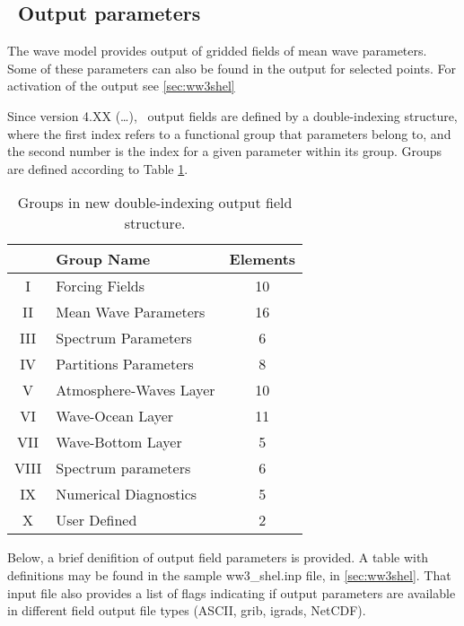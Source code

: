 \vssub
\subsection{~Output parameters} \label{sub:outpars}
\vssub

The wave model provides output of gridded fields of mean wave
parameters. Some of these parameters can also be found in the output for
selected points. For activation of the output see \para\ref{sec:ww3shel}

Since version 4.XX (\ldots), \ws\ output fields are defined by a
double-indexing structure, where the first index refers to a functional group
that parameters belong to, and the second number is the index for a given
parameter within its group. Groups are defined according to Table
\ref{tab:noge}.

\begin{table} \begin{center}
 \begin{tabular}{|c|l|c|} \hline \hline
     & Group Name & Elements \\ \hline
 I   & Forcing Fields & 10 \\
 II  & Mean Wave Parameters & 16 \\ 
 III & Spectrum Parameters & 6 \\
 IV  & Partitions Parameters & 8 \\
 V   & Atmosphere-Waves Layer & 10 \\
 VI  & Wave-Ocean Layer & 11 \\
 VII & Wave-Bottom Layer & 5 \\
 VIII& Spectrum parameters & 6 \\
 IX  & Numerical Diagnostics & 5 \\
 X   & User Defined & 2 \\ \hline
\end{tabular} \end{center}
\caption{Groups in new double-indexing output field structure.}
\label{tab:noge} \botline \end{table}

Below, a brief denifition of output field parameters is provided. A table
with definitions may be found in the sample {\code ww3\_shel.inp} file,
in \para\ref{sec:ww3shel}. That input file also provides a list of flags  
indicating if output parameters are available in different field
output file types (ASCII, grib, igrads, NetCDF). 

